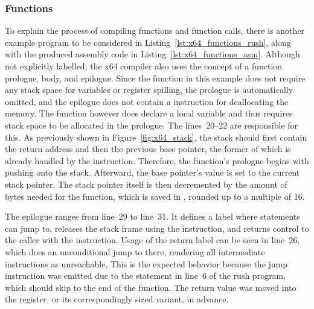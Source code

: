 \subsubsection{Functions}


To explain the process of compiling functions and function calls, there is another example program to be considered in Listing~\ref{lst:x64_functions_rush}, along with the produced assembly code in Listing~\ref{lst:x64_functions_asm}.
Although not explicitly labelled, the x64 compiler also uses the concept of a function prologue, body, and epilogue.
Since the  function in this example does not require any stack space for variables or register spilling, the prologue is automatically omitted, and the epilogue does not contain a  instruction for deallocating the memory.
The  function however does declare a local variable and thus requires stack space to be allocated in the prologue.
The lines~20--22 are responsible for this.
As previously shown in Figure~\ref{fig:x64_stack}, the stack should first contain the return address and then the previous base pointer, the former of which is already handled by the  instruction.
Therefore, the function's prologue begins with pushing  onto the stack.
Afterward, the base pointer's value is set to the current stack pointer.
The stack pointer itself is then decremented by the amount of bytes needed for the function, which is saved in , rounded up to a multiple of 16.


The epilogue ranges from line~29 to line~31.
It defines a label where  statements\label{x64_return} can jump to, releases the stack frame using the  instruction, and returns control to the caller with the  instruction.
Usage of the return label can be seen in line~26, which does an unconditional jump to there, rendering all intermediate instructions as unreachable.
This is the expected behavior because the jump instruction was emitted due to the  statement in line~6 of the rush program, which should skip to the end of the function.
The return value was moved into the  register, or its correspondingly sized variant, in advance.

